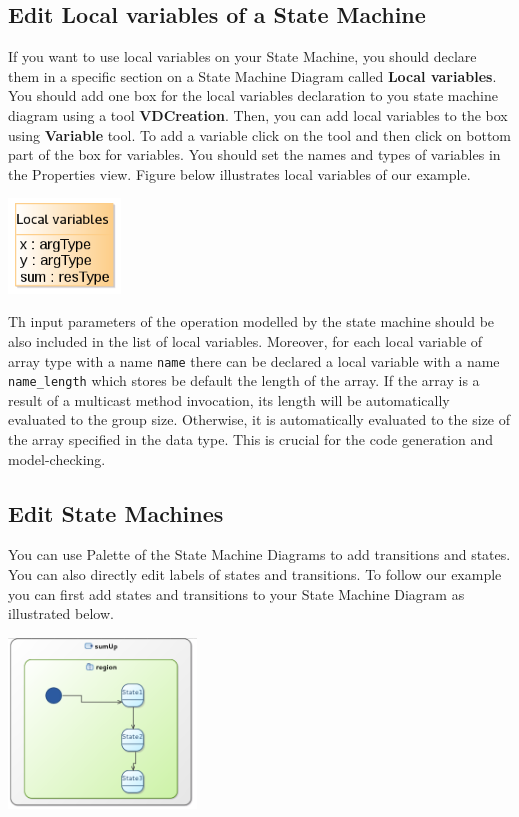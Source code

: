 \documentclass[12pt]{article}
\begin{document}
\subsection{Edit Local variables of a State Machine }
If you want to use local variables on your State Machine, you should declare them in a specific section on a State Machine Diagram called \textbf{Local variables}. You should add one box for the local variables declaration to you state machine diagram using a tool \textbf{VDCreation}. Then, you can add local variables to the box using \textbf{Variable} tool. To add a variable click on the tool and then click on bottom part of the box for variables. You should set the names and types of variables in the Properties view. Figure below illustrates local variables of our example.

     \centerline{
     \includegraphics[width=3cm]{draws/loc-var.png}
     \label{fig:vce-proj}
     }
 
 Th input parameters of the operation modelled by the state machine should be also included in the list of local variables. Moreover, for each local variable of array type with a name \texttt{name} there can be declared a local variable with a name \texttt{name\_length} which stores be default the length of the array. If the array is a result of a multicast method invocation, its length will be automatically evaluated to the group size. Otherwise, it is automatically evaluated to the size of the array specified in the data type. This is crucial for the code generation and model-checking.
 
\subsection{Edit State Machines}
\label{sm}
You can use Palette of the State Machine Diagrams to add transitions and states. You can also directly edit labels of states and transitions. To follow our example you can first add states and transitions to your State Machine Diagram as illustrated below.

     \centerline{
     \includegraphics[width=5cm]{draws/sm-no-lbl.png}
     \label{fig:vce-proj}
     }
     
\end{document}
